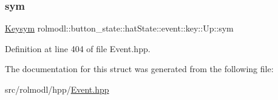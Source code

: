 \subsubsection{\texorpdfstring{sym}{sym}}
{\footnotesize\ttfamily \mbox{\hyperlink{structrolmodl_1_1button__state_1_1_keysym}{Keysym}} rolmodl\+::button\+\_\+state\+::hat\+State\+::event\+::key\+::\+Up\+::sym}



Definition at line 404 of file Event.\+hpp.



The documentation for this struct was generated from the following file\+:\begin{DoxyCompactItemize}
\item 
src/rolmodl/hpp/\mbox{\hyperlink{_event_8hpp}{Event.\+hpp}}\end{DoxyCompactItemize}
